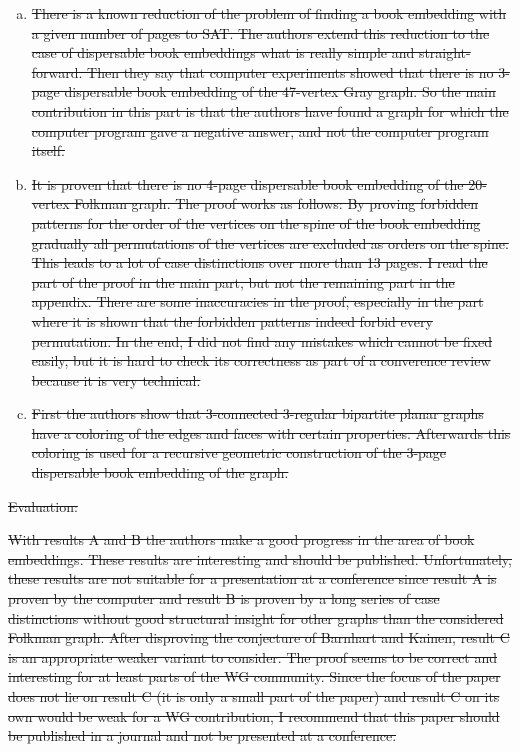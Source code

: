 \documentclass{article}
\begin{document}
\begin{itemize}
{\begin{enumerate}[(a)]
\item \st{There is a known reduction of the problem of finding a book embedding with a given number of pages to SAT.
   The authors extend this reduction to the case of dispersable book embeddings what is really simple and straight-forward.
   Then they say that computer experiments showed that there is no 3-page dispersable book embedding of the 47-vertex
   Gray graph. So the main contribution in this part is that the authors have found a graph for which the computer
   program gave a negative answer, and not the computer program itself.}
\item \st{It is proven that there is no 4-page dispersable book embedding of the 20-vertex Folkman graph.
   The proof works as follows: By proving forbidden patterns for the order of the vertices on the spine
   of the book embedding gradually all permutations of the vertices are excluded as orders on the spine.
   This leads to a lot of case distinctions over more than 13 pages. I read the part of the proof in the main part,
   but not the remaining part in the appendix. There are some inaccuracies in the proof, especially in the part where
   it is shown that the forbidden patterns indeed forbid every permutation. In the end, I did not find any mistakes which cannot be fixed easily, but it is hard to check its correctness as part of a converence review because it is very
   technical.}
\item \st{First the authors show that 3-connected 3-regular bipartite planar graphs have a coloring of the edges
   and faces with certain properties. Afterwards this coloring is used for a recursive geometric construction
   of the 3-page dispersable book embedding of the graph.}
\end{enumerate}

\st{Evaluation:}

\st{With results A and B the authors make a good progress in the area of book embeddings. These results are interesting
and should be published. Unfortunately, these results are not suitable for a presentation at a conference
since result A is proven by the computer and result B is proven by a long series of case distinctions without
good structural insight for other graphs than the considered Folkman graph.
After disproving the conjecture of Barnhart and Kainen, result C is an appropriate weaker variant to consider.
The proof seems to be correct and interesting for at least parts of the WG community.
Since the focus of the paper does not lie on result C (it is only a small part of the paper) and result C on its own would be weak for a WG
contribution, I recommend that this paper should be published in a journal and not be presented at a
conference.}

}
\end{itemize}
\end{document}
